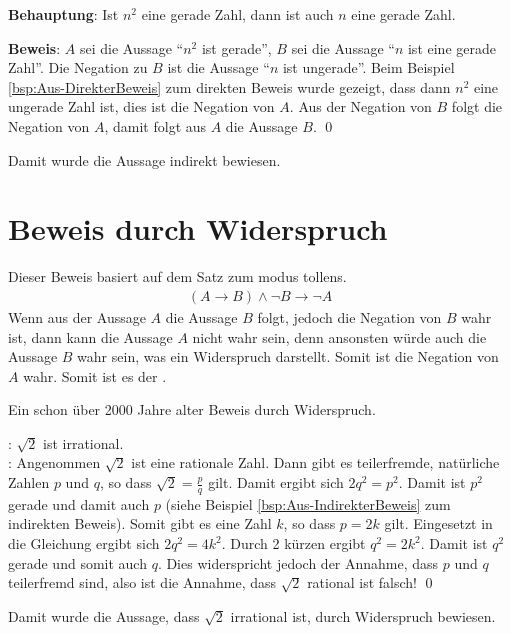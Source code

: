 \begin{Unit}[Beispiel]
\label{bsp:Aus-IndirekterBeweis}

\textbf{Behauptung}: Ist $n^2$ eine gerade Zahl, dann ist auch $n$ eine gerade 
Zahl.

\textbf{Beweis}: $A$ sei die Aussage \enquote{$n^2$ ist gerade}, $B$ sei die 
Aussage \enquote{$n$ ist eine gerade Zahl}. Die Negation zu $B$ ist die Aussage 
\enquote{$n$ ist ungerade}. Beim Beispiel \ref{bsp:Aus-DirekterBeweis} zum 
direkten Beweis wurde gezeigt, dass dann $n^2$ eine ungerade Zahl ist, dies 
ist die Negation von $A$. Aus der Negation von $B$ folgt die Negation von $A$, 
damit folgt aus $A$ die Aussage $B$. \qed

Damit wurde die Aussage indirekt bewiesen.
\end{Unit}

\section{Beweis durch Widerspruch}
\label{sec:Beweis - Widerspruch}

\begin{Unit}
Dieser Beweis basiert auf dem Satz zum modus tollens.
\begin{align}
  (A \rightarrow B) \land \neg B \rightarrow \neg A
\end{align}
Wenn aus der Aussage $A$ die Aussage $B$ folgt, jedoch die Negation von $B$ 
wahr ist, dann kann die Aussage $A$ nicht wahr sein, denn ansonsten würde auch 
die Aussage $B$ wahr sein, was ein Widerspruch darstellt. Somit ist die 
Negation von $A$ wahr. Somit ist es der . 
\end{Unit}

\begin{Unit}[Beispiel]
Ein schon über 2000 Jahre alter Beweis durch Widerspruch.

: $\sqrt{2}$ ist irrational. \\
: 
Angenommen $\sqrt{2}$ ist eine rationale Zahl. Dann gibt es teilerfremde, 
natürliche Zahlen $p$ und $q$, so dass $\sqrt{2} = \frac{p}{q}$ gilt. 
Damit ergibt sich $2q^2 = p^2$. Damit ist $p^2$ gerade und damit auch 
$p$ (siehe Beispiel \ref{bsp:Aus-IndirekterBeweis} zum indirekten Beweis). 
Somit gibt es eine Zahl $k$, so dass  $p=2k$ gilt. 
Eingesetzt in die Gleichung ergibt sich $2q^2 = 4k^2$. Durch 2 kürzen ergibt 
$q^2 = 2k^2$. 
Damit ist $q^2$ gerade und somit auch $q$. 
Dies widerspricht jedoch der Annahme, dass $p$ und $q$ teilerfremd sind, also 
ist die Annahme, dass $\sqrt{2}$ rational ist falsch! 
\vspace*{0.5ex} 
\qed

Damit wurde die Aussage, dass $\sqrt{2}$ irrational ist, durch Widerspruch
bewiesen.
\end{Unit}

